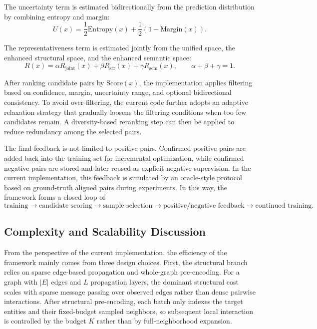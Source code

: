 The uncertainty term is estimated bidirectionally from the prediction distribution by combining entropy and margin:
\begin{equation}
U(x)
=
\frac{1}{2}\mathrm{Entropy}(x)
+
\frac{1}{2}\left(1-\mathrm{Margin}(x)\right).
\end{equation}

The representativeness term is estimated jointly from the unified space, the enhanced structural space, and the enhanced semantic space:
\begin{equation}
R(x)
=
\alpha R_{\mathrm{joint}}(x)
+
\beta R_{\mathrm{str}}(x)
+
\gamma R_{\mathrm{sem}}(x),
\qquad
\alpha+\beta+\gamma=1.
\end{equation}

After ranking candidate pairs by $\mathrm{Score}(x)$, the implementation applies filtering based on confidence, margin, uncertainty range, and optional bidirectional consistency. To avoid over-filtering, the current code further adopts an adaptive relaxation strategy that gradually loosens the filtering conditions when too few candidates remain. A diversity-based reranking step can then be applied to reduce redundancy among the selected pairs.

The final feedback is not limited to positive pairs. Confirmed positive pairs are added back into the training set for incremental optimization, while confirmed negative pairs are stored and later reused as explicit negative supervision. In the current implementation, this feedback is simulated by an oracle-style protocol based on ground-truth aligned pairs during experiments. In this way, the framework forms a closed loop of
\begin{equation}
\text{training}
\rightarrow
\text{candidate scoring}
\rightarrow
\text{sample selection}
\rightarrow
\text{positive/negative feedback}
\rightarrow
\text{continued training}.
\end{equation}

\subsection{Complexity and Scalability Discussion}

From the perspective of the current implementation, the efficiency of the framework mainly comes from three design choices. First, the structural branch relies on sparse edge-based propagation and whole-graph pre-encoding. For a graph with $|E|$ edges and $L$ propagation layers, the dominant structural cost scales with sparse message passing over observed edges rather than dense pairwise interactions. After structural pre-encoding, each batch only indexes the target entities and their fixed-budget sampled neighbors, so subsequent local interaction is controlled by the budget $K$ rather than by full-neighborhood expansion.

